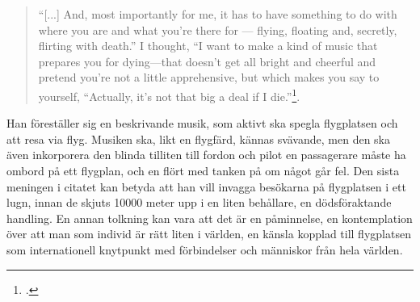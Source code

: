 \documentclass{article}
\begin{document}
\begin{quote}
``[...] And, most importantly for me, it has to have
something to do with where you are and what you’re there for — flying, floating and, secretly, flirting with
death.'' I thought, ``I want to make a kind of music that prepares you for dying—that doesn’t get all bright and
cheerful and pretend you’re not a little apprehensive, but which makes you say to yourself, ``Actually, it’s
not that big a deal if I die.''\footcite[152]{Eno}.
\end{quote}

Han föreställer sig en beskrivande musik, som aktivt ska spegla flygplatsen och att resa via flyg. Musiken
ska, likt en flygfärd, kännas svävande, men den ska även inkorporera den blinda tilliten till fordon och pilot
en passagerare måste ha ombord på ett flygplan, och en flört med tanken på om något går fel. Den sista meningen i
citatet kan betyda att han vill invagga besökarna på flygplatsen i ett lugn, innan de skjuts 10000 meter upp 
i en liten behållare, en dödsföraktande handling. En annan tolkning kan vara att det är en påminnelse, en
kontemplation över att man som individ är rätt liten i världen, en känsla kopplad till flygplatsen som 
internationell knytpunkt med förbindelser och människor från hela världen. 






\end{document}
